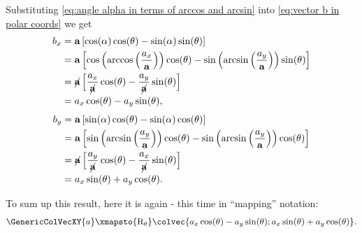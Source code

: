 Substituting \autoref{eq:angle alpha in terms of arccos and arcsin} into \autoref{eq:vector b in polar coords} we get
\begin{equation}
	\begin{aligned}
		b_{x} & = \mathbf{a}\left[\cos(\alpha)\cos(\theta) - \sin(\alpha)\sin(\theta)\right]                                                                                                   \\
		      & = \mathbf{a}\left[\cos\left(\arccos\left(\frac{a_{x}}{\mathbf{a}}\right)\right)\cos(\theta) - \sin\left(\arcsin\left(\frac{a_{y}}{\mathbf{a}}\right)\right)\sin(\theta)\right] \\
		      & = \cancel{\mathbf{a}}\left[\frac{a_{x}}{\cancel{\mathbf{a}}}\cos(\theta) - \frac{a_{y}}{\cancel{\mathbf{a}}}\sin(\theta)\right]                                                \\
		      & = a_{x}\cos(\theta)-a_{y}\sin(\theta),
	\end{aligned}
	\label{eq:}
\end{equation}
\begin{equation}
	\begin{aligned}
		b_{y} & = \mathbf{a}\left[\sin(\alpha)\cos(\theta) - \sin(\alpha)\cos(\theta)\right]                                                                                                   \\
		      & = \mathbf{a}\left[\sin\left(\arcsin\left(\frac{a_{y}}{\mathbf{a}}\right)\right)\cos(\theta) - \sin\left(\arcsin\left(\frac{a_{y}}{\mathbf{a}}\right)\right)\cos(\theta)\right] \\
		      & = \cancel{\mathbf{a}}\left[\frac{a_{y}}{\cancel{\mathbf{a}}}\cos(\theta) - \frac{a_{x}}{\cancel{\mathbf{a}}}\sin(\theta)\right]                                                \\
		      & = a_{x}\sin(\theta)+a_{y}\cos(\theta).
	\end{aligned}
	\label{eq:components of rotated vector}
\end{equation}

To sum up this result, here it is again - this time in \enquote{mapping} notation:
\begin{equation}
	\GenericColVecXY{a} \xmapsto{\text{R}_{\theta}} \colvec{a_{x}\cos(\theta)-a_{y}\sin(\theta);a_{x}\sin(\theta)+a_{y}\cos(\theta)}.
	\label{eq:vector rotation is direct column notation}
\end{equation}

